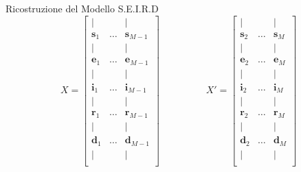 \documentclass[serif]{beamer}
\begin{document}
\begin{frame}{Ricostruzione del Modello S.E.I.R.D}
\[
X=\begin{bmatrix}
    | & & | \\
    \mathbf{s}_1  & \dots & \mathbf{s}_{M-1} \\ 
    | & & | \\
    \mathbf{e}_1    & \dots & \mathbf{e}_{M-1} \\ 
    | & & | \\
    \mathbf{i}_1  & \dots  & \mathbf{i}_{M-1} \\
    | & & | \\
    \mathbf{r}_1 & \dots & \mathbf{r}_{M-1} \\ 
    | & & | \\
    \mathbf{d}_1 & \dots & \mathbf{d}_{M-1} \\
    | & & | \\
\end{bmatrix}  \hspace{2cm} X'=\begin{bmatrix}
    | & & | \\
    \mathbf{s}_2  & \dots & \mathbf{s}_{M} \\ 
    | & & | \\
    \mathbf{e}_2    & \dots & \mathbf{e}_{M} \\ 
    | & & | \\
    \mathbf{i}_2  & \dots  & \mathbf{i}_{M} \\
    | & & | \\
    \mathbf{r}_2 & \dots & \mathbf{r}_{M} \\ 
    | & & | \\
    \mathbf{d}_2 & \dots & \mathbf{d}_{M} \\
    | & & | \\
\end{bmatrix} 
\]
    
\end{frame}

\begin{frame}
    \begin{center}
    \end{center}
\end{frame}
\end{document}
